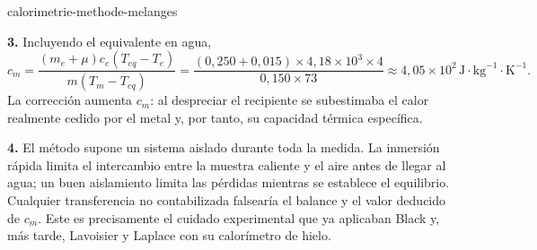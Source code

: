 \begin{exo}{calorimetrie-methode-melanges}
\begin{solution}
\textbf{3.} Incluyendo el equivalente en agua,
\[
c_m=\frac{(m_e+\mu)c_e(T_{eq}-T_e)}{m(T_m-T_{eq})}
=\frac{(0{,}250+0{,}015)\times4{,}18\times10^3\times4}{0{,}150\times73}
\approx4{,}05\times10^2\,\text{J}\!\cdot\!\text{kg}^{-1}\!\cdot\!\text{K}^{-1}.
\]
La corrección aumenta $c_m$: al despreciar el recipiente se subestimaba el calor realmente cedido por el metal y, por tanto, su capacidad térmica específica.

\textbf{4.} El método supone un sistema aislado durante toda la medida. La inmersión rápida limita el intercambio entre la muestra caliente y el aire antes de llegar al agua; un buen aislamiento limita las pérdidas mientras se establece el equilibrio. Cualquier transferencia no contabilizada falsearía el balance y el valor deducido de $c_m$. Este es precisamente el cuidado experimental que ya aplicaban Black y, más tarde, Lavoisier y Laplace con su calorímetro de hielo.
\end{solution}
\end{exo}


